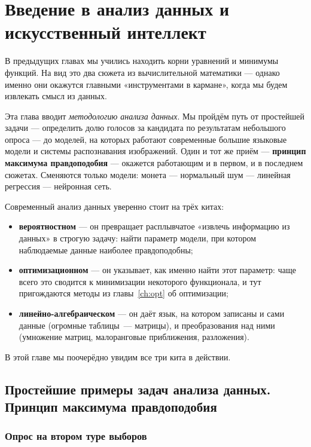 \chapter{Введение в анализ данных и искусственный интеллект}
\label{ch:dataai}

В предыдущих главах мы учились находить корни уравнений и минимумы
функций. На вид это два сюжета из вычислительной математики — однако
именно они окажутся главными «инструментами в кармане», когда мы будем
извлекать смысл из данных.

Эта глава вводит \emph{методологию анализа данных}. Мы пройдём путь от
простейшей задачи — определить долю голосов за кандидата по результатам
небольшого опроса — до моделей, на которых работают современные большие
языковые модели и системы распознавания изображений. Один и тот же
приём — \textbf{принцип максимума правдоподобия} — окажется
работающим и в первом, и в последнем сюжетах. Сменяются только модели:
монета — нормальный шум — линейная регрессия — нейронная сеть.

Современный анализ данных уверенно стоит на трёх китах:
\begin{itemize}\itemsep1pt
  \item \textbf{вероятностном} — он превращает расплывчатое «извлечь
        информацию из данных» в строгую задачу: найти параметр модели,
        при котором наблюдаемые данные наиболее правдоподобны;
  \item \textbf{оптимизационном} — он указывает, как именно найти
        этот параметр: чаще всего это сводится к минимизации некоторого
        функционала, и тут пригождаются методы из главы~\ref{ch:opt} об оптимизации;
  \item \textbf{линейно-алгебраическом} — он даёт язык, на котором
        записаны и сами данные (огромные таблицы~--- матрицы), и
        преобразования над ними (умножение матриц, малоранговые
        приближения, разложения).
\end{itemize}

В этой главе мы поочерёдно увидим все три кита в действии.

\section{Простейшие примеры задач анализа данных.
         Принцип максимума правдоподобия}
\label{sec:mle}

\subsection{Опрос на втором туре выборов}
\label{ssec:bernoulli}


